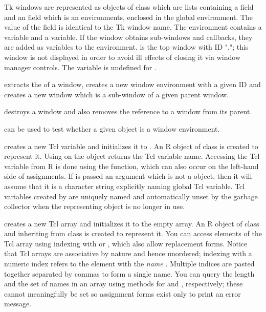 \begin{Details}
Tk windows are represented as objects of class  which are
lists containing  a  field and an  field which is
an \R{} environments, enclosed in the global environment.  The value of
the  field is identical to the Tk window name. The 
environment contains a  variable and a 
variable.  If the window obtains sub-windows and  callbacks, they are
added as variables to the environment.    is the top
window with ID "."; this window is not  displayed in order to avoid
ill effects of closing it via window  manager controls. The
 variable is undefined for .

 extracts the  of a window,
 creates a new window environment with a given ID and
 creates a new window which is a sub-window of a given
parent window.

 destroys a window and also removes the reference to a
window from its parent.

 can be used to test whether a given object is a window
environment.

 creates a new Tcl variable and initializes it to
.  An R object of class  is created to
represent it.  Using  on the object returns the Tcl
variable name.  Accessing the Tcl variable from R is done using the 
 function, which can also occur on the left-hand side of
assignments.  If  is passed an argument which is not a
 object, then it will assume that it is a character string
explicitly naming global Tcl variable. Tcl variables created by 
 are uniquely named and automatically unset by the
garbage collector when the representing object is no longer in use. 

 creates a new Tcl array and initializes it to the empty
array.  An R object of class  and inheriting from class
 is created to represent it. You can access elements of
the Tcl array using indexing with \code{[[} or \code{\$}, which also
allow replacement forms.  Notice that Tcl arrays are associative by
nature and hence unordered; indexing with a numeric index 
refers to the element with the \emph{name}
.  Multiple indices are pasted together separated
by commas to form a single name.  You can query the
length and the set of names in an array using methods for
 and , respectively; these cannot
meaningfully be set so assignment forms exist only to print an error
message. 


\end{Details}
